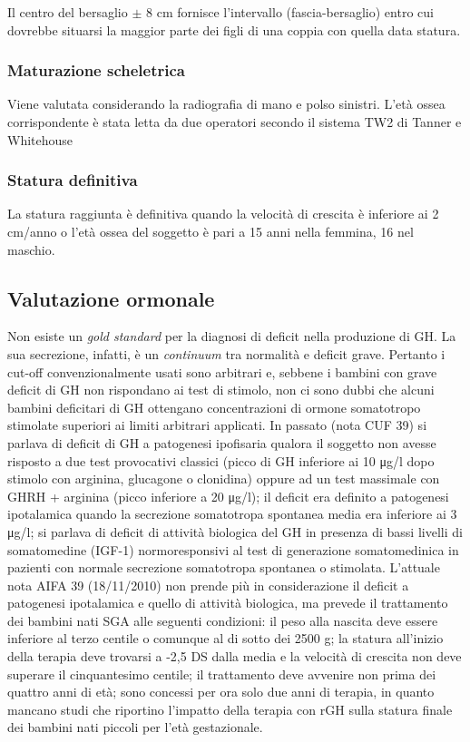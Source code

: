 Il centro del bersaglio $\pm$ 8 cm fornisce l'intervallo (fascia-bersaglio) entro cui dovrebbe situarsi la maggior parte dei figli di una coppia con quella data statura.

\subsubsection*{Maturazione scheletrica}
Viene valutata considerando la radiografia di mano e polso sinistri. L'età ossea corrispondente è stata letta da due operatori secondo il sistema TW2 di Tanner e Whitehouse%


\subsubsection*{Statura definitiva}
La statura raggiunta è definitiva quando la velocità di crescita è inferiore ai 2 cm/anno o l'età ossea del soggetto è pari a 15 anni nella femmina, 16 nel maschio.


\clearpage

\subsection{Valutazione ormonale}

Non esiste un \emph{gold standard} per la diagnosi di deficit nella produzione di GH\cite{gh2003update}. La sua secrezione, infatti, è un \emph{continuum} tra normalità e deficit grave. Pertanto i cut-off convenzionalmente usati sono arbitrari e, sebbene i bambini con grave deficit di GH non rispondano ai test di stimolo, non ci sono dubbi che alcuni bambini deficitari di GH ottengano concentrazioni di ormone somatotropo stimolate superiori ai limiti arbitrari applicati.
In passato (nota CUF 39) si parlava di deficit di GH a patogenesi ipofisaria qualora il soggetto non avesse risposto a due test provocativi classici (picco di GH inferiore ai 10 \unit{\micro g}/l dopo stimolo con arginina, glucagone o clonidina) oppure ad un test massimale con GHRH + arginina (picco inferiore a 20 \unit{\micro g}/l); il deficit era definito a patogenesi ipotalamica quando la secrezione somatotropa spontanea media era inferiore ai 3 \unit{\micro g}/l; si parlava di deficit di attività biologica del GH in presenza di bassi livelli di somatomedine (IGF-1) normoresponsivi al test di generazione somatomedinica in pazienti con normale secrezione somatotropa spontanea o stimolata.
L'attuale nota AIFA 39 (18/11/2010) non prende più in considerazione il deficit a patogenesi ipotalamica e quello di attività biologica, ma prevede il trattamento dei bambini nati SGA alle seguenti condizioni: il peso alla nascita deve essere inferiore al terzo centile o comunque al di sotto dei 2500 g; la statura all'inizio della terapia deve trovarsi a -2,5 DS dalla media e la velocità di crescita non deve superare il cinquantesimo centile; il trattamento deve avvenire non prima dei quattro anni di età; sono concessi per ora solo due anni di terapia, in quanto mancano studi che riportino l'impatto della terapia con rGH sulla statura finale dei bambini nati piccoli per l'età gestazionale.

